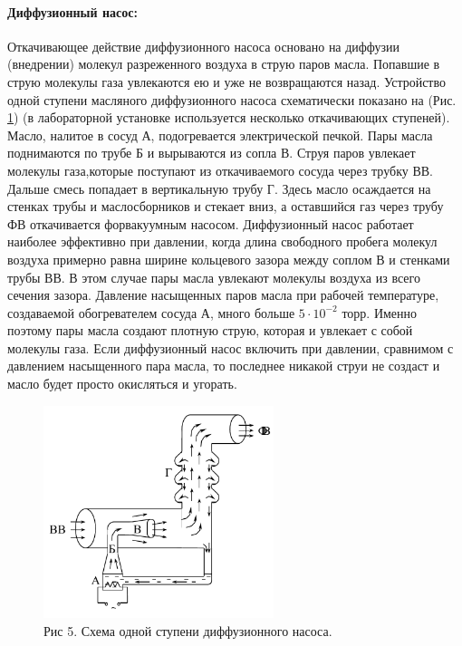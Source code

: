 \documentclass[a4paper]{article}
\begin{document}
    \newpage

    \paragraph{Диффузионный насос:}
    Откачивающее действие диффузионного насоса основано на диффузии (внедрении) молекул разреженного воздуха в струю паров масла. Попавшие в струю молекулы газа увлекаются ею и уже не возвращаются назад. Устройство одной ступени масляного диффузионного насоса схематически показано на (Рис. \ref{ris:diffuzionni_nasos}) (в лабораторной установке используется несколько откачивающих ступеней). Масло, налитое в сосуд А, подогревается электрической печкой. Пары масла поднимаются по трубе Б и вырываются из сопла В. Струя паров увлекает молекулы газа,которые поступают из откачиваемого сосуда через трубку ВВ. Дальше смесь попадает в вертикальную трубу Г. Здесь масло осаждается на стенках трубы и маслосборников и стекает вниз, а оставшийся газ через трубу ФВ откачивается форвакуумным насосом. Диффузионный насос работает наиболее эффективно при давлении, когда длина свободного пробега молекул воздуха примерно равна ширине кольцевого зазора между соплом В и стенками трубы ВВ. В этом случае пары масла увлекают молекулы воздуха из всего сечения зазора. Давление насыщенных паров масла при рабочей температуре, создаваемой обогревателем сосуда А, много больше $5\cdot10^{-2}$ торр. Именно поэтому пары масла создают плотную струю, которая и увлекает с собой молекулы газа. Если диффузионный насос включить при давлении, сравнимом с давлением насыщенного пара масла, то последнее никакой струи не создаст и масло будет просто окисляться и угорать.

    \begin{figure}[h]
    \centering
        \includegraphics[width=0.6\textwidth]{diffuzionni_nasos}
        \caption{Рис 5. Схема одной ступени диффузионного насоса.}
        \label{ris:diffuzionni_nasos}
    \end{figure}
	
\end{document}
